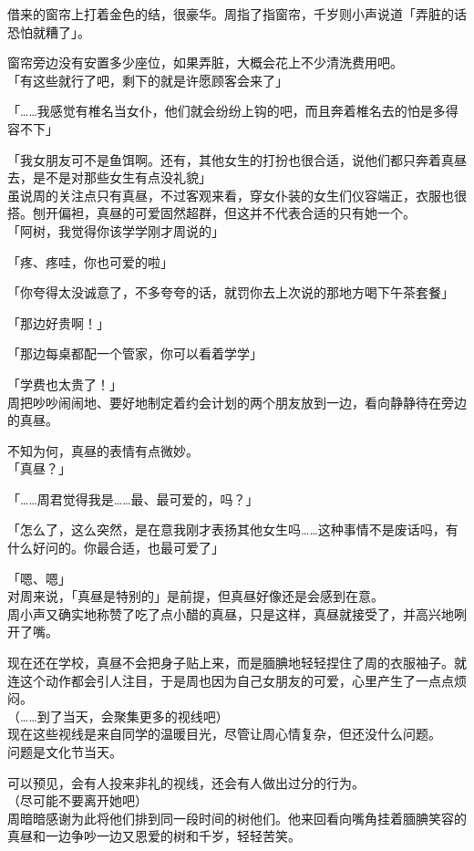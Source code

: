 借来的窗帘上打着金色的结，很豪华。周指了指窗帘，千岁则小声说道「弄脏的话恐怕就糟了」。

窗帘旁边没有安置多少座位，如果弄脏，大概会花上不少清洗费用吧。\\

「有这些就行了吧，剩下的就是许愿顾客会来了」

「……我感觉有椎名当女仆，他们就会纷纷上钩的吧，而且奔着椎名去的怕是多得容不下」

「我女朋友可不是鱼饵啊。还有，其他女生的打扮也很合适，说他们都只奔着真昼去，是不是对那些女生有点没礼貌」\\

虽说周的关注点只有真昼，不过客观来看，穿女仆装的女生们仪容端正，衣服也很搭。刨开偏袒，真昼的可爱固然超群，但这并不代表合适的只有她一个。\\

「阿树，我觉得你该学学刚才周说的」

「疼、疼哇，你也可爱的啦」

「你夸得太没诚意了，不多夸夸的话，就罚你去上次说的那地方喝下午茶套餐」

「那边好贵啊！」

「那边每桌都配一个管家，你可以看着学学」

「学费也太贵了！」\\

周把吵吵闹闹地、要好地制定着约会计划的两个朋友放到一边，看向静静待在旁边的真昼。

不知为何，真昼的表情有点微妙。\\

「真昼？」

「……周君觉得我是……最、最可爱的，吗？」

「怎么了，这么突然，是在意我刚才表扬其他女生吗……这种事情不是废话吗，有什么好问的。你最合适，也最可爱了」

「嗯、嗯」\\

对周来说，「真昼是特别的」是前提，但真昼好像还是会感到在意。\\

周小声又确实地称赞了吃了点小醋的真昼，只是这样，真昼就接受了，并高兴地咧开了嘴。

现在还在学校，真昼不会把身子贴上来，而是腼腆地轻轻捏住了周的衣服袖子。就连这个动作都会引人注目，于是周也因为自己女朋友的可爱，心里产生了一点点烦闷。\\

（……到了当天，会聚集更多的视线吧）\\

现在这些视线是来自同学的温暖目光，尽管让周心情复杂，但还没什么问题。\\

问题是文化节当天。

可以预见，会有人投来非礼的视线，还会有人做出过分的行为。\\

（尽可能不要离开她吧）\\

周暗暗感谢为此将他们排到同一段时间的树他们。他来回看向嘴角挂着腼腆笑容的真昼和一边争吵一边又恩爱的树和千岁，轻轻苦笑。
